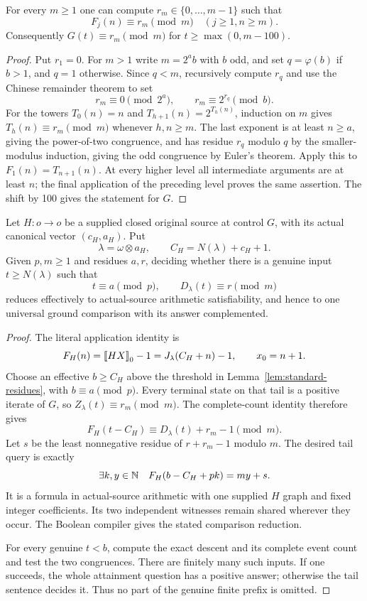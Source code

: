 \begin{lemma}\label{lem:standard-residues}
For every $m\ge1$ one can compute $r_m\in\{0,\ldots,m-1\}$
such that
\[
 F_j(n)\equiv r_m\pmod m\quad(j\ge1, n\ge m).
\]
Consequently $G(t)\equiv r_m\pmod m$ for
$t\ge\max(0,m-100)$.
\end{lemma}
\begin{proof}
Put $r_1=0$. For $m>1$ write $m=2^a b$ with $b$ odd, and set
$q=\varphi(b)$ if $b>1$, and $q=1$ otherwise. Since $q<m$,
recursively compute $r_q$ and use the Chinese remainder theorem to set
\[
 r_m\equiv0\pmod{2^a},\qquad r_m\equiv2^{r_q}\pmod b.
\]
For the towers $T_0(n)=n$ and $T_{h+1}(n)=2^{T_h(n)}$,
induction on $m$ gives $T_h(n)\equiv r_m\pmod m$ whenever
$h,n\ge m$. The last exponent is at least $n\ge a$, giving
the power-of-two congruence, and has residue $r_q$ modulo $q$ by
the smaller-modulus induction, giving the odd congruence by Euler's
theorem. Apply this to $F_1(n)=T_{n+1}(n)$. At every higher level
all intermediate arguments are at least $n$; the final application
of the preceding level proves the same assertion. The shift by 100
gives the statement for $G$.
\end{proof}

\begin{proposition}
\label{prop:actual-attainment}
Let $H:o\to o$ be a supplied closed original source at control $G$,
with its actual canonical vector $(c_H,a_H)$. Put
\[
 \lambda=\omega\otimes a_H,\qquad
 C_H=N(\lambda)+c_H+1.
\]
Given $p,m\ge1$ and residues $a,r$, deciding whether there is a
genuine input $t\ge N(\lambda)$ such that
\[
 t\equiv a\pmod p,\qquad D_\lambda(t)\equiv r\pmod m
\]
reduces effectively to actual-source arithmetic satisfiability, and
hence to one universal ground comparison with its answer complemented.
\end{proposition}
\begin{proof}
The literal application identity is
\[
 F_H(n)=\mathopen{[\![}HX\mathclose{]\!]}_0-1=J_\lambda(C_H+n)-1,
 \qquad x_0=n+1.
\]
Choose an effective $b\ge C_H$ above the threshold in
Lemma~\ref{lem:standard-residues}, with $b\equiv a\pmod p$.
Every terminal state on that tail is a positive iterate of $G$, so
$Z_\lambda(t)\equiv r_m\pmod m$. The complete-count identity
therefore gives
\[
 F_H(t-C_H)\equiv D_\lambda(t)+r_m-1\pmod m.
\]
Let $s$ be the least nonnegative residue of $r+r_m-1$ modulo $m$.
The desired tail query is exactly
\[
 \exists k,y\in\mathbb N\quad
       F_H(b-C_H+pk)=my+s.
\]
It is a formula in actual-source arithmetic with one supplied $H$
graph and fixed integer coefficients. Its two independent witnesses
remain shared wherever they occur. The Boolean compiler gives the
stated comparison reduction.

For every genuine $t<b$, compute the exact descent and its complete
event count and test the two congruences. There are finitely many such
inputs. If one succeeds, the whole attainment question has a positive
answer; otherwise the tail sentence decides it. Thus no part of the
genuine finite prefix is omitted.
\end{proof}

